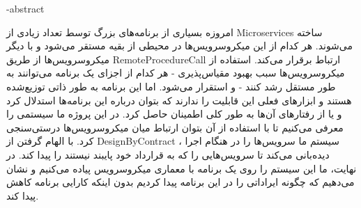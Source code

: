 \fa-abstract{
امروزه بسیاری از برنامه‌های بزرگ توسط تعداد زیادی از 
\glspl{Microservice}
ساخته می‌شوند. هر کدام از این میکروسرویس‌ها در محیطی از بقیه مستقر می‌شود و با دیگر میکروسرویس‌ها از طریق
\gls{RemoteProcedureCall}
ارتباط برقرار می‌کند. استفاده از میکروسرویس‌ها سبب بهبود مقیاس‌پذیری - هر کدام از اجزای یک برنامه می‌توانند به طور مستقل رشد کنند - و استقرار می‌شود. اما این برنامه‌ به طور ذاتی توزیع‌شده هستند و ابزارهای فعلی این قابلیت را ندارند که بتوان درباره این برنامه‌ها استدلال کرد و یا از رفتارهای آن‌ها به طور کلی اطمینان حاصل کرد.
در این پروژه ما سیستمی را معرفی می‌کنیم تا با استفاده از آن بتوان ارتباط میان میکروسرویس‌ها درستی‌سنجی کرد. با الهام گرفتن از
\gls{DesignByContract}
، سیستم ما سرویس‌ها را در هنگام اجرا دیده‌بانی می‌کند تا سرویس‌هایی را که به قرارداد خود پایبند نیستند را پیدا کند. در نهایت، ما این سیستم را روی یک برنامه با معماری میکروسرویس پیاده می‌کنیم و نشان می‌دهیم که چگونه ایراداتی را در این برنامه پیدا کردیم بدون اینکه کارایی برنامه کاهش پیدا کند.

}
